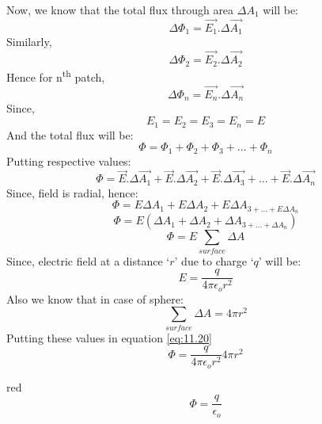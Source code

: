 Now, we know that the total flux through area $\Delta A_{1}$ will be:
\begin{equation}
  \Delta \Phi_{1} = \vec{E_{1}}.\Delta \vec{A_{1}} \nonumber
\end{equation}
Similarly,
\begin{equation}
  \Delta \Phi_{2} = \vec{E_{2}}.\Delta \vec{A_{2}} \nonumber
\end{equation}
Hence for n\textsuperscript{th} patch, 
\begin{equation}
  \Delta \Phi_{n} = \vec{E_{n}}.\Delta \vec{A_{n}} \nonumber
\end{equation}
Since,
\begin{equation}
  E_{1} = E_{2} = E_{3} = E_{n} = E \nonumber
\end{equation}
And the total flux will be:
\begin{equation}
  \Phi =  \Phi_{1}+ \Phi_{2}+ \Phi_{3}+...+ \Phi_{n} \nonumber
\end{equation}
Putting respective values:
\begin{equation}
  \Phi = \vec{E}.\Delta \vec{A_{1}}+\vec{E}.\Delta \vec{A_{2}} +\vec{E}.\Delta \vec{A_{3}}+...+\vec{E}.\Delta \vec{A_{n}} \nonumber
\end{equation}
Since, field is radial, hence:
\begin{equation}
  \Phi = E\Delta A_{1} + E\Delta A_{2} + E\Delta A_{3+...+E\Delta A_{n}} \nonumber
\end{equation}
\begin{equation}
  \Phi = E(\Delta A_{1} + \Delta A_{2} + \Delta A_{3+...+\Delta A_{n}}) \nonumber
\end{equation}
\begin{equation}\label{eq:11.20}
  \Phi = E\sum_{surface} \Delta A 
\end{equation}
Since, electric field at a distance `$r$' due to charge `$q$' will be:
\begin{equation}
  E = \frac{q}{4\pi\epsilon_{o}r^{2}} \nonumber
\end{equation}
Also we know that in case of sphere:
\begin{equation}
  \sum_{surface} \Delta A = 4\pi r^{2} \nonumber
\end{equation}
Putting these values in equation \ref{eq:11.20}
\begin{equation}
  \Phi = \frac{q}{4\pi\epsilon_{o}r^{2}} 4\pi r^{2} \nonumber
\end{equation}
\begin{mybox}{red}{}
\begin{equation}\label{eq:11.21}
  \Phi = \frac{q}{\epsilon_{o}}
\end{equation}
\end{mybox}
